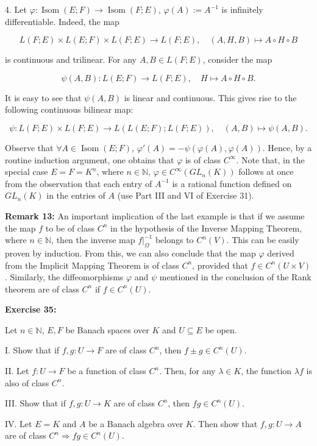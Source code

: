 \documentclass{book}
\begin{document}
4. Let $\varphi : \operatorname{Isom}(E; F) \to \operatorname{Isom}(F; E)$, $\varphi(A) := A^{-1}$ is infinitely differentiable. Indeed, the map

\[
L(F; E) \times L(E; F) \times L(F; E) \to L(F; E), \quad (A, H, B) \mapsto A \circ H \circ B
\]

is continuous and trilinear. For any $A, B \in L(F; E)$, consider the map

\[
\psi(A, B) : L(E; F) \to L(F; E), \quad H \mapsto A \circ H \circ B.
\]

It is easy to see that $\psi(A, B)$ is linear and continuous. This gives rise to the following continuous bilinear map:

\[
\psi : L(F; E) \times L(F; E) \to L(L(E; F); L(F; E)), \quad (A, B) \mapsto \psi(A, B).
\]

Observe that $\forall A \in \operatorname{Isom}(E; F)$, $\varphi'(A) = -\psi(\varphi(A), \varphi(A))$. Hence, by a routine induction argument, one obtains that $\varphi$ is of class $C^{\infty}$. Note that, in the special case $E = F = K^n$, where $n \in \mathbb{N}$, $\varphi \in C^{\infty}(GL_n(K))$ follows at once from the observation that each entry of $A^{-1}$ is a rational function defined on $GL_n(K)$ in the entries of $A$ (use Part III and VI of Exercise 31).

\textbf{Remark 13:} An important implication of the last example is that if we assume the map $f$ to be of class $C^n$ in the hypothesis of the Inverse Mapping Theorem, where $n \in \mathbb{N}$, then the inverse map $f|_{\Omega}^{-1}$ belongs to $C^n(V)$. This can be easily proven by induction. From this, we can also conclude that the map $\varphi$ derived from the Implicit Mapping Theorem is of class $C^n$, provided that $f \in C^n(U \times V)$. Similarly, the diffeomorphisms $\varphi$ and $\psi$ mentioned in the conclusion of the Rank theorem are of class $C^n$ if $f \in C^n(U)$.


\textbf{Exercise 35:}

Let $n \in \mathbb{N}$, $E, F$ be Banach spaces over $K$ and $U \subseteq E$ be open.

I. Show that if $f, g : U \to F$ are of class $C^n$, then $f \pm g \in C^n(U)$.

II. Let $f : U \to F$ be a function of class $C^n$. Then, for any $\lambda \in K$, the function $\lambda f$ is also of class $C^n$.

III. Show that if $f, g : U \to K$ are of class $C^n$, then $fg \in C^n(U)$.

IV. Let $E = K$ and $A$ be a Banach algebra over $K$. Then show that $f, g : U \to A$ are of class $C^n \Longrightarrow fg \in C^n(U)$.
\end{document}
